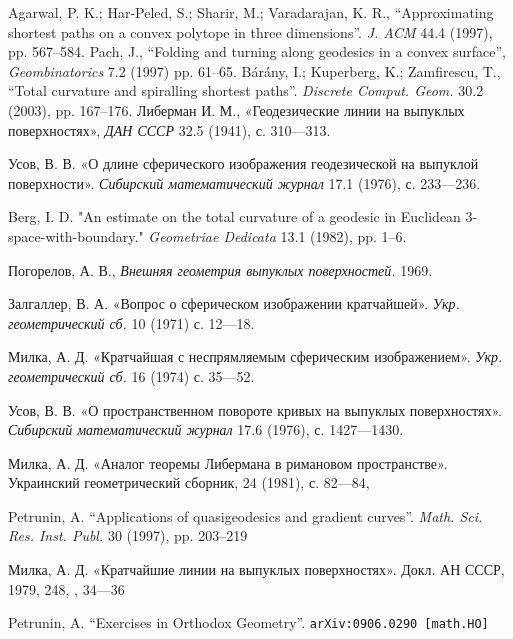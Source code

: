 \begin{thebibliography}{99}
Agarwal, P. K.; Har-Peled, S.; Sharir, M.; Varadarajan, K. R.,
``Approximating shortest paths on a convex polytope in three dimensions''.
\textit{J. ACM}
44.4 (1997),
pp. 567--584.
Pach, J.,
``Folding and turning along geodesics in a convex surface'',
\textit{Geombinatorics}
7.2 (1997)
pp. 61--65.
B{\'a}r{\'a}ny, I.; Kuperberg, K.; Zamfirescu, T.,
``Total curvature and spiralling shortest paths''.
\textit{Discrete Comput. Geom.}
30.2 (2003),
pp. 167--176.
Либерман И. М.,
«Геодезические
 линии
 на
 выпуклых
 поверхностях»,
\textit{ДАН СССР}
32.5 (1941),
с. 310---313. 

Усов, В. В. 
«О длине сферического изображения геодезической на выпуклой поверхности». \textit{Сибирский математический журнал} 
17.1 (1976), 
с. 233---236.

Berg, I. D. 
"An estimate on the total curvature of a geodesic in Euclidean 3-space-with-boundary." 
\textit{Geometriae Dedicata} 
13.1 (1982),
pp. 1--6.

Погорелов, А. В., 
\textit{Внешняя геометрия выпуклых поверхностей.} 
1969.

Залгаллер, В. А. 
«Вопрос о сферическом изображении кратчайшей».
\textit{Укр. геометрический сб.}
10 (1971) 
с. 12---18.

Милка, А. Д. 
«Кратчайшая с неспрямляемым сферическим изображением». 
\textit{Укр. геометрический сб.} 16 (1974)
с. 35---52.

Усов, В. В. 
«О пространственном повороте кривых на выпуклых поверхностях». 
\textit{Сибирский математический журнал}
17.6 (1976),
с. 1427---1430.

Милка, А. Д. 
«Аналог теоремы Либермана в римановом пространстве».
Украинский геометрический сборник,
24 (1981), 
с. 82---84,

Petrunin, A.
``Applications of quasigeodesics and gradient curves''.
\textit{Math. Sci. Res. Inst. Publ.}
30 (1997),
pp. 203--219

  Милка, А. Д. «Кратчайшие  линии  на  выпуклых  поверхностях».  Докл.  АН  СССР,   1979,   248, ,  34---36  

Petrunin, A.
``Exercises in Orthodox Geometry''.
\texttt{arXiv:0906.0290 [math.HO]}
\end{thebibliography}